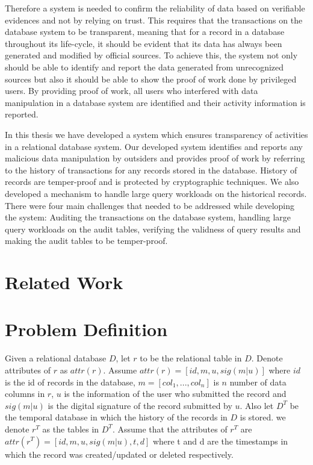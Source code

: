 Therefore a system is needed to confirm the reliability of data based on verifiable evidences and not by relying on trust. This requires that the transactions on the database system to be transparent, meaning that for a record in a database throughout its life-cycle, it should be evident that its data has always been generated and modified by official sources. To achieve this, the system not only should be able to identify and report the data generated from unrecognized sources but also it should be able to show the proof of work done by privileged users. By providing proof of work, all users who interfered with data manipulation in a database system are identified and their activity information is reported. 

In this thesis we have developed a system which ensures transparency of activities in a relational database system. Our developed system identifies and reports any malicious data manipulation by outsiders and provides proof of work by referring to the history of transactions for any records stored in the database. History of records are temper-proof and is protected by cryptographic techniques. We also developed a mechanism to handle large query workloads on the historical records. There were four main challenges that needed to be addressed while developing the system: Auditing the transactions on the database system, handling large query workloads on the audit tables, verifying the validness of query results and making the audit tables to be temper-proof. 
\section{Related Work}
\section{Problem Definition}
Given a relational database $D$, let $r$ to be the relational table in $D$. Denote attributes of $r$ as $attr(r)$. Assume $attr(r)= [id,m,u, sig(m|u)]$ where $id$ is the id of records in the database, $m = [col_1,...,col_n]$ is $n$ number of data columns in $r$, $u$ is the information of the user who submitted the record and $sig(m|u)$ is the digital signature of the record submitted by $u$. Also let $D^T$ be the temporal database in which the history of the records in $D$ is stored. we denote $r^T$ as the tables in $D^T$. Assume that the attributes of $r^T$ are $attr(r^T) = [id,m,u,sig(m|u),t,d]$ where t and d are the timestamps in which the record was created/updated or deleted respectively.\\

